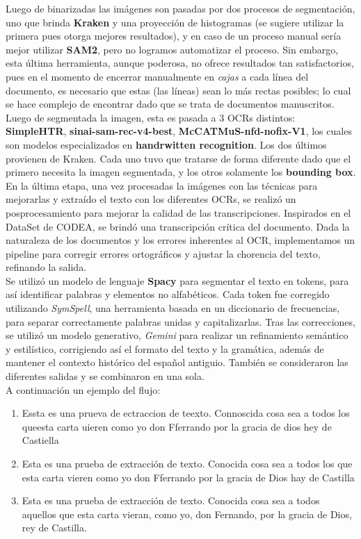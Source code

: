 \documentclass[11pt,a4paper]{article}
\begin{document}
Luego de binarizadas las im\'agenes son pasadas por dos procesos de segmentación, uno que brinda \textbf{Kraken} y una proyecci\'on de histogramas (se sugiere utilizar la primera pues otorga mejores resultados), y en caso de un proceso manual ser\'ia mejor utilizar \textbf{SAM2}, pero no logramos automatizar el proceso. Sin embargo, esta última herramienta, aunque poderosa, no ofrece resultados tan satisfactorios, pues en el momento de encerrar manualmente en \textit{cajas} a cada línea del documento, es necesario que estas (las líneas) sean lo más rectas posibles; lo cual se hace complejo de encontrar dado que se trata de documentos manuscritos. \\
Luego de segmentada la imagen, esta es pasada a 3 OCRs distintos: \textbf{SimpleHTR}, \textbf{sinai-sam-rec-v4-best}, \textbf{McCATMuS-nfd-nofix-V1}, los cuales son modelos especializados en \textbf{handrwitten recognition}. Los dos \'ultimos provienen de Kraken. Cada uno tuvo que tratarse de forma diferente dado que el primero necesita la imagen segmentada, y los otros solamente los \textbf{bounding box}.\\

En la \'ultima etapa, una vez procesadas la im\'agenes con las t\'ecnicas para mejorarlas y extraído el texto con los diferentes OCRs, se realiz\'o un posprocesamiento para mejorar la calidad de las transcripciones. Inspirados en el DataSet de CODEA, se brindó una transcripción cr\'itica del documento. Dada la naturaleza de los documentos y los errores inherentes al OCR, implementamos un pipeline para corregir errores ortogr\'aficos y ajustar la chorencia del texto, refinando la salida.\\

Se utiliz\'o un modelo de lenguaje \textbf{Spacy} para segmentar el texto en tokens, para as\'i identificar palabras y elementos no alfab\'eticos. Cada token fue corregido utilizando \textit{SymSpell}, una herramienta basada en un diccionario de frecuencias, para separar correctamente palabras unidas y capitalizarlas. Tras  las correcciones, se utiliz\'o un modelo generativo, \textit{Gemini} para realizar un refinamiento sem\'antico y estil\'istico, corrigiendo as\'i el formato del texto y la gram\'atica, adem\'as de mantener el contexto hist\'orico del español antiguio. Tambi\'en se consideraron las diferentes salidas y se combinaron en una sola.\\

A continuaci\'on un ejemplo del flujo:

\begin{enumerate}
    \item Essta es una prueva de ectraccion de teexto. Connoscida cosa sea a todos los queesta carta uieren como yo don Fferrando por la gracia de dios hey de Castiella
    \item Esta es una prueba de extracción de texto. Conocida cosa sea a todos los que esta carta vieren como yo don Fferrando por la gracia de Dios hay de Castilla
    \item Esta es una prueba de extracción de texto. Conocida cosa sea a todos aquellos que esta carta vieran, como yo, don Fernando, por la gracia de Dios, rey de Castilla.
\end{enumerate}
\end{document}
